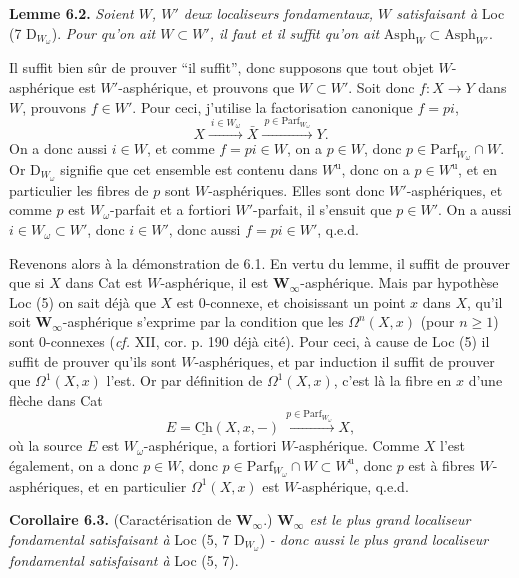 \documentclass[11pt]{article}
\newcommand{\printedpage}[1]{\marginpar{\footnotesize p.~#1}}
\newcommand{\msp}[1]{\marginpar{\footnotesize [#1]}}
\begin{document}
\textbf{Lemme 6.2.} \textit{Soient $W$, $W'$ deux localiseurs fondamentaux, $W$ satisfaisant à} Loc (7 D$_{W_\omega}$). \textit{Pour qu'on ait $W \subset W'$, il faut et il suffit qu'on ait} $\mathrm{Asph}_W \subset \mathrm{Asph}_{W'}$.

\msp{page 84}
Il suffit bien sûr de prouver “il suffit”, donc supposons que tout objet $W$-asphérique est $W'$-asphérique, et prouvons que $W \subset W'$. Soit donc $f : X \longrightarrow Y$ dans $W$, prouvons $f \in W'$. Pour ceci, j'utilise la factorisation canonique $f = pi$,
\[ X \xrightarrow{\ i \in W_\omega\ } \bar{X} \xrightarrow{\ p \in \mathrm{Parf}_{W_\omega}\ } Y. \]
\printedpage{45}
On a donc aussi $i \in W$, et comme $f = pi \in W$, on a $p \in W$, donc $p \in \mathrm{Parf}_{W_\omega} \cap W$. Or D$_{W_\omega}$ signifie que cet ensemble est contenu dans $W^{\mathrm{u}}$, donc on a $p \in W^{\mathrm{u}}$, et en particulier les fibres de $p$ sont $W$-asphériques. Elles sont donc $W'$-asphériques, et comme $p$ est $W_\omega$-parfait et a fortiori $W'$-parfait, il s'ensuit que $p \in W'$. On a aussi $i \in W_\omega \subset W'$, donc $i \in W'$, donc aussi $f = pi \in W'$, q.e.d.

Revenons alors à la démonstration de 6.1. En vertu du lemme, il suffit de prouver que si $X$ dans Cat est $W$-asphérique, il est $\mathbf{W}_\infty$-asphérique. Mais par hypothèse Loc (5) on sait déjà que $X$ est 0-connexe, et choisissant un point $x$ dans $X$, qu'il soit $\mathbf{W}_\infty$-asphérique s'exprime par la condition
\msp{page 85}
que les $\Omega^n(X,x)$ (pour $n \geq 1$) sont 0-connexes (\textit{cf.} XII, cor. p. 190 déjà cité). Pour ceci, à cause de Loc (5) il suffit de prouver qu'ils sont $W$-asphériques, et par induction il suffit de prouver que $\Omega^1(X,x)$ l'est. Or par définition de $\Omega^1(X,x)$, c'est là la fibre en $x$ d'une flèche dans Cat
\[ E = \underline{\mathrm{Ch}}(X,x,-) \xrightarrow{\ p \in \mathrm{Parf}_{W_\omega}\ } X, \]
où la source $E$ est $W_\omega$-asphérique, a fortiori $W$-asphérique. Comme $X$ l'est également, on a donc $p \in W$, donc $p \in \mathrm{Parf}_{W_\omega} \cap W \subset W^{\mathrm{u}}$, donc $p$ est à fibres $W$-asphériques, et en particulier $\Omega^1(X,x)$ est $W$-asphérique, q.e.d.

\textbf{Corollaire 6.3.} (Caractérisation de $\mathbf{W}_\infty$.) \textit{$\mathbf{W}_\infty$ est le plus grand localiseur fondamental satisfaisant à} Loc (5, 7 D$_{W_\omega}$) \textit{- donc aussi le plus grand localiseur fondamental satisfaisant à} Loc (5, 7).
\end{document}

